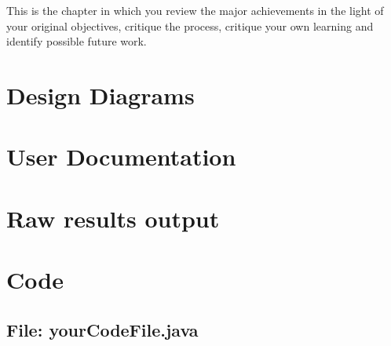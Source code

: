 \documentclass[11pt,openright,a4paper]{report}
\begin{document}
This is the chapter in which you review the major achievements in the
light of your original objectives, critique the process, critique your
own learning and identify possible future work.



\appendix


\chapter{Design Diagrams}

\chapter{User Documentation}

\chapter{Raw results output}

\chapter{Code}


\begin{landscape}
\begin{multicols}{2}
\section{File: yourCodeFile.java}

\end{multicols}
\end{landscape}
\end{document}
